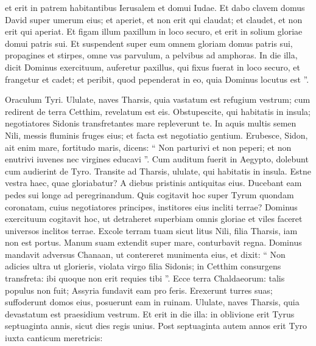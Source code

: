 \begin{biblechapter}
\begin{biblechapter}
\begin{biblechapter}
\begin{biblechapter}
\begin{biblechapter}
\begin{biblechapter}
\begin{biblechapter}
\begin{biblechapter}
\begin{biblechapter}
\begin{biblechapter}
\begin{biblechapter}
\begin{biblechapter}
\begin{biblechapter}
\begin{biblechapter}
\begin{biblechapter}
\begin{biblechapter}
\begin{biblechapter}
\begin{biblechapter}
\begin{biblechapter}
\begin{biblechapter}
\begin{biblechapter}
\begin{biblechapter}
 et erit in patrem habitantibus Ierusalem
 et domui Iudae.
 \verse Et dabo clavem domus David
 super umerum eius;
 et aperiet, et non erit qui claudat;
 et claudet, et non erit qui aperiat.
 \verse Et figam illum paxillum in loco securo,
 et erit in solium gloriae domui patris sui.
 \verse Et suspendent super eum omnem gloriam domus patris sui, propagines et stirpes, omne vas parvulum, a pelvibus ad amphoras. 
\verse In die illa, dicit Dominus exercituum, auferetur paxillus, qui fixus fuerat in loco securo, et frangetur et cadet; et peribit, quod pependerat in eo, quia Dominus locutus est ”.
 
\begin{biblechapter}
\verse Oraculum Tyri.
 Ululate, naves Tharsis,
 quia vastatum est refugium vestrum;
 cum redirent de terra Cetthim, revelatum est eis.
 \verse Obstupescite, qui habitatis in insula;
 negotiatores Sidonis
 transfretantes mare repleverunt te. 
\verse In aquis multis semen Nili,
 messis fluminis fruges eius;
 et facta est negotiatio gentium.
 \verse Erubesce, Sidon, ait enim mare,
 fortitudo maris, dicens:
 “ Non parturivi et non peperi;
 et non enutrivi iuvenes
 nec virgines educavi ”.
 \verse Cum auditum fuerit in Aegypto,
 dolebunt cum audierint de Tyro.
 \verse Transite ad Tharsis,
 ululate, qui habitatis in insula.
 \verse Estne vestra haec, quae gloriabatur?
 A diebus pristinis antiquitas eius.
 Ducebant eam pedes sui longe
 ad peregrinandum.
 \verse Quis cogitavit hoc
 super Tyrum quondam coronatam,
 cuius negotiatores principes,
 institores eius incliti terrae?
 \verse Dominus exercituum cogitavit hoc,
 ut detraheret superbiam omnis gloriae
 et viles faceret universos inclitos terrae.
 \verse Excole terram tuam sicut litus Nili,
 filia Tharsis, iam non est portus.
 \verse Manum suam extendit super mare,
 conturbavit regna.
 Dominus mandavit adversus Chanaan,
 ut contereret munimenta eius,
 \verse et dixit: “ Non adicies ultra ut glorieris,
 violata virgo filia Sidonis;
 in Cetthim consurgens transfreta:
 ibi quoque non erit requies tibi ”.
 \verse Ecce terra Chaldaeorum:
 talis populus non fuit;
 Assyria fundavit eam pro feris.
 Erexerunt turres suas;
 suffoderunt domos eius,
 posuerunt eam in ruinam.
 \verse Ululate, naves Tharsis,
 quia devastatum est praesidium vestrum.
 \verse Et erit in die illa: in oblivione erit Tyrus septuaginta annis, sicut dies regis unius. Post septuaginta autem annos erit Tyro iuxta canticum meretricis:

\end{biblechapter}
\end{biblechapter}
\end{biblechapter}
\end{biblechapter}
\end{biblechapter}
\end{biblechapter}
\end{biblechapter}
\end{biblechapter}
\end{biblechapter}
\end{biblechapter}
\end{biblechapter}
\end{biblechapter}
\end{biblechapter}
\end{biblechapter}
\end{biblechapter}
\end{biblechapter}
\end{biblechapter}
\end{biblechapter}
\end{biblechapter}
\end{biblechapter}
\end{biblechapter}
\end{biblechapter}
\end{biblechapter}
